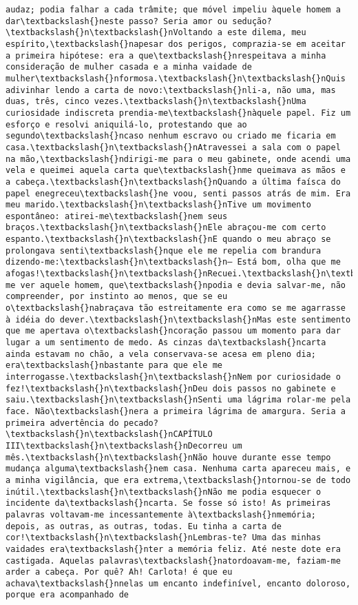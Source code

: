 \documentclass[11pt]{article}
\begin{document}
\begin{Verbatim}[commandchars=\\\{\}]
audaz; podia falhar a cada trâmite; que móvel impeliu àquele homem a dar\textbackslash{}neste passo? Seria amor ou sedução?\textbackslash{}n\textbackslash{}nVoltando a este dilema, meu espírito,\textbackslash{}napesar dos perigos, comprazia-se em aceitar a primeira hipótese: era a que\textbackslash{}nrespeitava a minha consideração de mulher casada e a minha vaidade de mulher\textbackslash{}nformosa.\textbackslash{}n\textbackslash{}nQuis adivinhar lendo a carta de novo:\textbackslash{}nli-a, não uma, mas duas, três, cinco vezes.\textbackslash{}n\textbackslash{}nUma curiosidade indiscreta prendia-me\textbackslash{}nàquele papel. Fiz um esforço e resolvi aniquilá-lo, protestando que ao segundo\textbackslash{}ncaso nenhum escravo ou criado me ficaria em casa.\textbackslash{}n\textbackslash{}nAtravessei a sala com o papel na mão,\textbackslash{}ndirigi-me para o meu gabinete, onde acendi uma vela e queimei aquela carta que\textbackslash{}nme queimava as mãos e a cabeça.\textbackslash{}n\textbackslash{}nQuando a última faísca do papel enegreceu\textbackslash{}ne voou, senti passos atrás de mim. Era meu marido.\textbackslash{}n\textbackslash{}nTive um movimento espontâneo: atirei-me\textbackslash{}nem seus braços.\textbackslash{}n\textbackslash{}nEle abraçou-me com certo espanto.\textbackslash{}n\textbackslash{}nE quando o meu abraço se prolongava senti\textbackslash{}nque ele me repelia com brandura dizendo-me:\textbackslash{}n\textbackslash{}n— Está bom, olha que me afogas!\textbackslash{}n\textbackslash{}nRecuei.\textbackslash{}n\textbackslash{}nEstristeceu-me ver aquele homem, que\textbackslash{}npodia e devia salvar-me, não compreender, por instinto ao menos, que se eu o\textbackslash{}nabraçava tão estreitamente era como se me agarrasse à idéia do dever.\textbackslash{}n\textbackslash{}nMas este sentimento que me apertava o\textbackslash{}ncoração passou um momento para dar lugar a um sentimento de medo. As cinzas da\textbackslash{}ncarta ainda estavam no chão, a vela conservava-se acesa em pleno dia; era\textbackslash{}nbastante para que ele me interrogasse.\textbackslash{}n\textbackslash{}nNem por curiosidade o fez!\textbackslash{}n\textbackslash{}nDeu dois passos no gabinete e saiu.\textbackslash{}n\textbackslash{}nSenti uma lágrima rolar-me pela face. Não\textbackslash{}nera a primeira lágrima de amargura. Seria a primeira advertência do pecado?\textbackslash{}n\textbackslash{}nCAPÍTULO III\textbackslash{}n\textbackslash{}nDecorreu um mês.\textbackslash{}n\textbackslash{}nNão houve durante esse tempo mudança alguma\textbackslash{}nem casa. Nenhuma carta apareceu mais, e a minha vigilância, que era extrema,\textbackslash{}ntornou-se de todo inútil.\textbackslash{}n\textbackslash{}nNão me podia esquecer o incidente da\textbackslash{}ncarta. Se fosse só isto! As primeiras palavras voltavam-me incessantemente à\textbackslash{}nmemória; depois, as outras, as outras, todas. Eu tinha a carta de cor!\textbackslash{}n\textbackslash{}nLembras-te? Uma das minhas vaidades era\textbackslash{}nter a memória feliz. Até neste dote era castigada. Aquelas palavras\textbackslash{}natordoavam-me, faziam-me arder a cabeça. Por quê? Ah! Carlota! é que eu achava\textbackslash{}nnelas um encanto indefinível, encanto doloroso, porque era acompanhado de 
\end{Verbatim}
\end{document}
